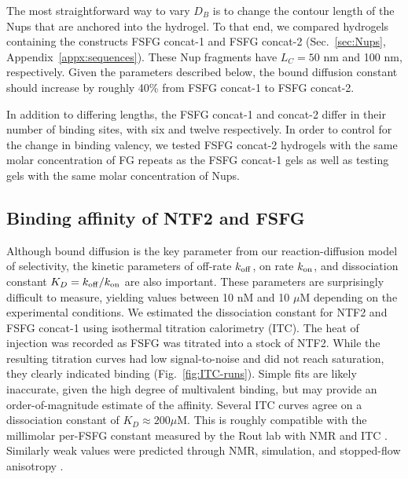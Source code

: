 The most straightforward way to vary $D_B$ is to change the contour length of the Nups that are anchored into the hydrogel.  To that end, we compared hydrogels containing the constructs FSFG concat-1 and FSFG concat-2 (Sec.~\ref{sec:Nups}, Appendix~\ref{appx:sequences}).  These Nup fragments have $L_C = 50$ nm and 100 nm, respectively.  Given the parameters described below, the bound diffusion constant should increase by roughly 40\% from FSFG concat-1 to FSFG concat-2.

In addition to differing lengths, the FSFG concat-1 and concat-2 differ in their number of binding sites, with six and twelve respectively.  In order to control for the change in binding valency, we tested FSFG concat-2 hydrogels with the same molar concentration of FG repeats as the FSFG concat-1 gels as well as testing gels with the same molar concentration of Nups.

\subsection{Binding affinity of NTF2 and FSFG}
Although bound diffusion is the key parameter from our reaction-diffusion model of selectivity, the kinetic parameters of off-rate $k_{\rm off}$, on rate $k_{\rm on}$, and dissociation constant $K_D = k_{\rm off}/k_{\rm on}$ are also important. These parameters are surprisingly difficult to measure, yielding values between 10 nM and 10 $\mu$M depending on the experimental conditions.  We estimated the dissociation constant for NTF2 and FSFG concat-1 using isothermal titration calorimetry (ITC).  The heat of injection was recorded as FSFG was titrated into a stock of NTF2.  While the resulting titration curves had low signal-to-noise and did not reach saturation, they clearly indicated binding (Fig.~\ref{fig:ITC-runs}).  Simple fits are likely inaccurate, given the high degree of multivalent binding, but may provide an order-of-magnitude estimate of the affinity.  Several ITC curves agree on a dissociation constant of $K_D \approx 200 \mu$M.  This is roughly compatible with the millimolar per-FSFG constant measured by the Rout lab with NMR and ITC \cite{hayama18}.  Similarly weak values were predicted through NMR, simulation, and stopped-flow anisotropy \cite{milles15}.


